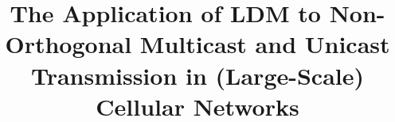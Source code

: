 \documentclass[12pt, draftclsnofoot, onecolumn]{IEEEtran}
\begin{document}
\title{The Application of LDM to Non-Orthogonal Multicast and Unicast Transmission in (Large-Scale) Cellular Networks}


\maketitle









\end{document}

